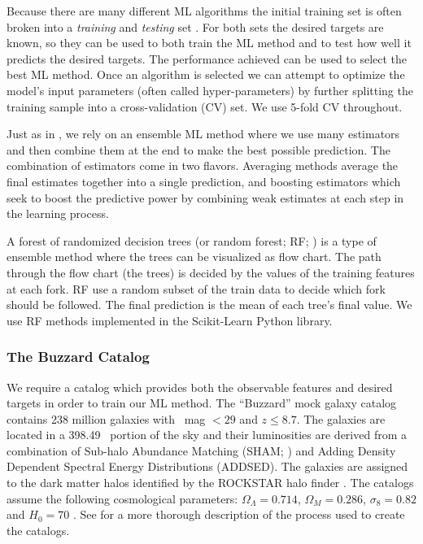 Because there are many different ML algorithms the initial training set is often broken into a \emph{training} and \emph{testing} set . For both sets the desired targets are known, so they can be used to both train the ML method and to test how well it predicts the desired targets. The performance achieved can be used to select the best ML method. Once an algorithm is selected we can attempt to optimize the model's input parameters (often called hyper-parameters) by further splitting the training sample into a cross-validation (CV) set. We use 5-fold CV throughout.

Just as in , we rely on an ensemble ML method  where we use many estimators and then combine them at the end to make the best possible prediction. The combination of estimators come in two flavors. Averaging methods average the final estimates together into a single prediction, and boosting estimators which seek to boost the predictive power by combining weak estimates at each step in the learning process.

A forest of randomized decision trees (or random forest; RF; \citealt{Ho1995, Ho1998}) is a type of ensemble method where the trees can be visualized as flow chart. The path through the flow chart (the trees) is decided by the values of the training features at each fork. RF use a random subset of the train data to decide which fork should be followed. The final prediction is the mean of each tree's final value. We use RF methods implemented in the {\sc Scikit-Learn} \citep{Pedregosa2012} Python library.

\subsubsection{The Buzzard Catalog}
We require a catalog which provides both the observable features and desired targets in order to train our ML method. The ``Buzzard'' mock galaxy catalog contains 238 million galaxies with \sdssr\ mag $< 29$ and $z \leq 8.7$. The galaxies are located in a 398.49 \degsq\ portion of the sky and their luminosities are derived from a combination of Sub-halo Abundance Matching (SHAM; \citealt{Reddick2013}) and Adding Density Dependent Spectral Energy Distributions (ADDSED). The galaxies are assigned to the dark matter halos identified by the {\sc ROCKSTAR} halo finder \citep{Behroozi2013}. The catalogs assume the following cosmological parameters: $\Omega_\Lambda = 0.714$, $\Omega_M = 0.286$, $\sigma_8 = 0.82$ and $H_0= 70$ \kms \mpc. See  for a more thorough description of the process used to create the catalogs.

